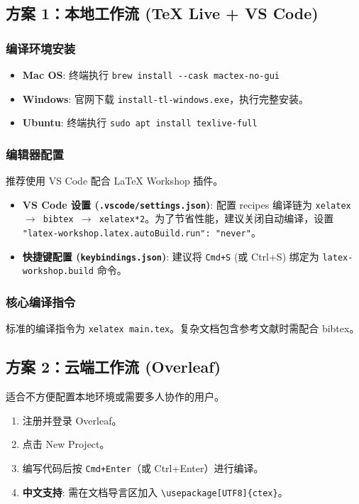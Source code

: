 \subsection{方案 1：本地工作流 (TeX Live + VS Code)}

\subsubsection{编译环境安装}
\begin{itemize}
    \item \textbf{Mac OS}: 终端执行 \texttt{brew install {-}{-}cask mactex-no-gui}
    \item \textbf{Windows}: 官网下载 \texttt{install-tl-windows.exe}，执行完整安装。
    \item \textbf{Ubuntu}: 终端执行 \texttt{sudo apt install texlive-full}
\end{itemize}

\subsubsection{编辑器配置}
推荐使用 VS Code 配合 LaTeX Workshop 插件。
\begin{itemize}
    \item \textbf{VS Code 设置 (\texttt{.vscode/settings.json})}: 
    配置 recipes 编译链为 \texttt{xelatex $\rightarrow$ bibtex $\rightarrow$ xelatex*2}。为了节省性能，建议关闭自动编译，设置 \texttt{"latex-workshop.latex.autoBuild.run": "never"}。
    \item \textbf{快捷键配置 (\texttt{keybindings.json})}: 
    建议将 \texttt{Cmd+S} (或 Ctrl+S) 绑定为 \texttt{latex-workshop.build} 命令。
\end{itemize}

\subsubsection{核心编译指令}
标准的编译指令为 \texttt{xelatex main.tex}。复杂文档包含参考文献时需配合 bibtex。

\subsection{方案 2：云端工作流 (Overleaf)}
适合不方便配置本地环境或需要多人协作的用户。
\begin{enumerate}
    \item 注册并登录 Overleaf。
    \item 点击 New Project。
    \item 编写代码后按 \texttt{Cmd+Enter}（或 Ctrl+Enter）进行编译。
    \item \textbf{中文支持}: 需在文档导言区加入 \texttt{\textbackslash usepackage[UTF8]\{ctex\}}。
\end{enumerate}

